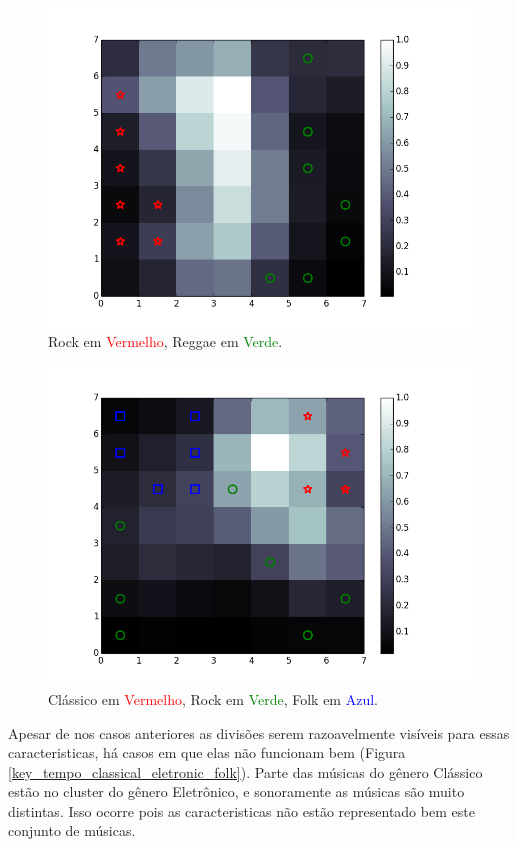 \documentclass[journal]{IEEEtran}
\begin{document}
\begin{figure}[H]
\centering
\includegraphics[scale=0.5]{images/key_tempo_rock_reggae.png}
\caption{Rock em \textcolor{red}{Vermelho}, Reggae em \textcolor{green}{Verde}.}\label{key_tempo_rock_reggae}
\end{figure}

\begin{figure}[H]
\centering
\includegraphics[scale=0.5]{images/key_tempo_rock_classical_folk.png}
\caption{Clássico em \textcolor{red}{Vermelho}, Rock em \textcolor{green}{Verde}, Folk em \textcolor{blue}{Azul}.}\label{key_tempo_rock_classical_folk}
\end{figure}

Apesar de nos casos anteriores as divisões serem razoavelmente visíveis para essas caracteristicas, há casos em que elas não funcionam bem (Figura \ref{key_tempo_classical_eletronic_folk}). Parte das músicas do gênero Clássico estão no cluster do gênero Eletrônico, e sonoramente as músicas são muito distintas. Isso ocorre pois as caracteristicas não estão representado bem este conjunto de músicas.
\end{document}
